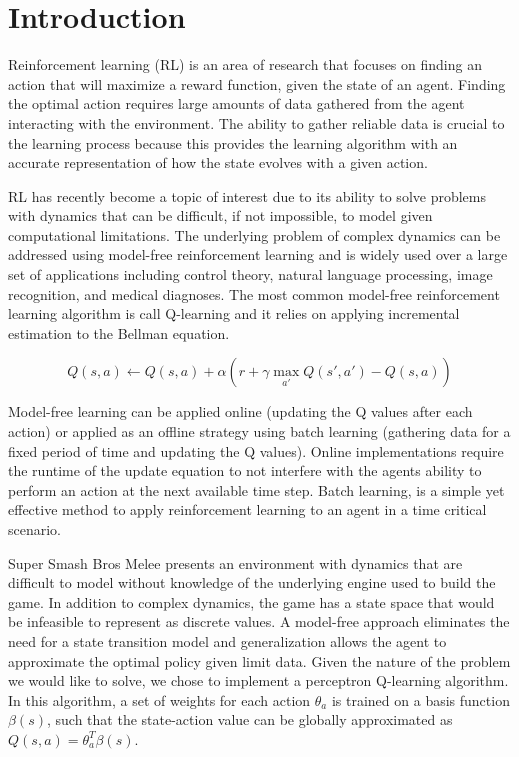 
\section{Introduction}

Reinforcement learning (RL) is an area of research that focuses on finding an action that will maximize a reward function, given the state of an agent. Finding the optimal action requires large amounts of data gathered from the agent interacting with the environment. The ability to gather reliable data is crucial to the learning process because this provides the learning algorithm with an accurate representation of how the state evolves with a given action. 

RL has recently become a topic of interest due to its ability to solve problems with dynamics that can be difficult, if not impossible, to model given computational limitations. The underlying problem of complex dynamics can be addressed using model-free reinforcement learning and is widely used over a large set of applications including control theory, natural language processing, image recognition, and medical diagnoses. The most common model-free reinforcement learning algorithm is call Q-learning and it relies on applying incremental estimation to the Bellman equation.

\begin{equation}
	Q(s,a) \leftarrow Q(s,a)+\alpha(r + \gamma \max_{a'} Q(s',a') - Q(s,a))
\end{equation}


Model-free learning can be applied online (updating the Q values after each action) or applied as an offline strategy using batch learning (gathering data for a fixed period of time and updating the Q values). Online implementations require the runtime of the update equation to not interfere with the agents ability to perform an action at the next available time step. Batch learning, is a simple yet effective method to apply reinforcement learning to an agent in a time critical scenario. 

Super Smash Bros Melee presents an environment with dynamics that are difficult to model without knowledge of the underlying engine used to build the game. In addition to complex dynamics, the game has a state space that would be infeasible to represent as discrete values. A model-free approach eliminates the need for a state transition model and generalization allows the agent to approximate the optimal policy given limit data. Given the nature of the problem we would like to solve, we chose to implement a perceptron Q-learning algorithm. In this algorithm, a set of weights for each action $\theta_a$ is trained on a basis function $\beta(s)$, such that the state-action value can be globally approximated as $Q(s,a) = \theta^T_a\beta(s)$.

